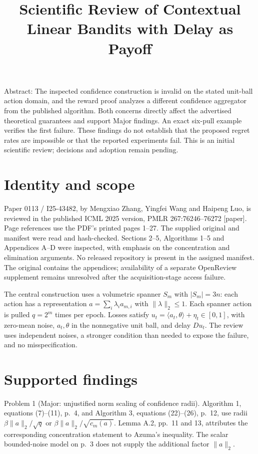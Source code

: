 \documentclass[10pt]{article}
\title{Scientific Review of
Contextual Linear Bandits with Delay as Payoff}
\author{}
\date{}
\begin{document}
\maketitle
Abstract: The inspected confidence construction is invalid on the stated unit-ball action domain, and the reward proof analyzes a different confidence aggregator from the published algorithm. Both concerns directly affect the advertised theoretical guarantees and support Major findings. An exact six-pull example verifies the first failure. These findings do not establish that the proposed regret rates are impossible or that the reported experiments fail. This is an initial scientific review; decisions and adoption remain pending.\par
\section*{Identity and scope}
Paper 0113 / I25-43482, by Mengxiao Zhang, Yingfei Wang and Haipeng Luo, is reviewed in the published ICML 2025 version, PMLR 267:76246–76272 [paper]. Page references use the PDF’s printed pages 1–27. The supplied original and manifest were read and hash-checked. Sections 2–5, Algorithms 1–5 and Appendices A–D were inspected, with emphasis on the concentration and elimination arguments. No released repository is present in the assigned manifest. The original contains the appendices; availability of a separate OpenReview supplement remains unresolved after the acquisition-stage access failure.\par
The central construction uses a volumetric spanner \(S_m\) with \(|S_m|=3n\): each action has a representation \(a=\sum_i\lambda_i a_{m,i}\) with \(\|\lambda\|_2\leq1\). Each spanner action is pulled \(q=2^m\) times per epoch. Losses satisfy \(u_t=\langle a_t,\theta\rangle+\eta_t\in[0,1]\), with zero-mean noise, \(a_t,\theta\) in the nonnegative unit ball, and delay \(D u_t\). The review uses independent noises, a stronger condition than needed to expose the failure, and no misspecification.\par
\section*{Supported findings}
Problem 1 (Major: unjustified norm scaling of confidence radii).  Algorithm 1, equations (7)–(11), p. 4, and Algorithm 3, equations (22)–(26), p. 12, use radii \(\beta\|a\|_2/\sqrt q\) or \(\beta\|a\|_2/\sqrt{c_m(a)}\). Lemma A.2, pp. 11 and 13, attributes the corresponding concentration statement to Azuma’s inequality. The scalar bounded-noise model on p. 3 does not supply the additional factor \(\|a\|_2\).\par
\end{document}

